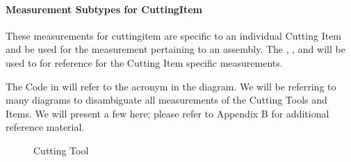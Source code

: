 \documentclass{mtconnect}	%
\begin{document}
\paragraph{Measurement Subtypes for CuttingItem}\mbox{}

These measurements for \gls{cuttingitem} are specific to an individual Cutting Item and \MUSTNOT be used for the measurement pertaining to an assembly.  The , ,  and  will be used to for reference for the Cutting Item specific measurements.

The Code in  will refer to the acronym in the diagram.  We will be referring to many diagrams to disambiguate all measurements of the Cutting Tools and Items.  We will present a few here; please refer to Appendix B for additional reference material.

\begin{figure}[ht]
  \centering
  \caption{Cutting Tool}
  \label{fig:cutting-tool}
\end{figure}

\FloatBarrier
\end{document}
